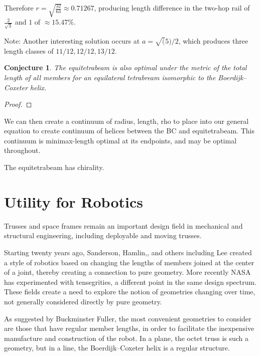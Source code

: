 \documentclass[11pt]{article}
\newtheorem{conjecture}{Conjecture}
\begin{document}
Therefore $ r = \sqrt{\frac{32}{63}} \approx 0.71267 $, producing length difference in the two-hop rail of
$\frac{2}{\sqrt{3}}$
and $1$ of $\approx 15.47\% $.

Note: Another interesting solution occurs at $a = \sqrt(5)/2$, which produces three length
classes of $11/12, 12/12, 13/12$.


\begin{conjecture}
  The equitetrabeam is also optimal under the metric of the total length of all members 
  for an equilateral tetrabream isomorphic to the Boerdijk--Coxeter helix.
\end{conjecture}

\begin{proof}
  
\end{proof}

We can then create a continuum of radius, length, rho to place into our general equation
to create continuum of helices between the BC and equitetrabeam. This continuum is 
minimax-length optimal at its endpoints, and may be optimal throughout.

The equitetrabeam has chirality.

\section{Utility for Robotics}

Trusses and space frames remain an important design field in mechanical and structural engineering\cite{mikulas1985sequentially},
including deployable and moving trusses\cite{claypool2012readily}.

Starting twenty years ago, Sanderson\cite{sanderson1996modular}, Hamlin,\cite{TetrobotBook}, and others including Lee\cite{lee2002dynamic}
created a style of robotics based on changing the lengths of members
joined at the center of a joint, thereby creating a connection to pure geometry. More recently NASA has experimented with
tensegrities\cite{NTRT}, a different point in the same design spectrum. These fields create a need to explore the notion of
geometries changing over time, not generally considered directly by pure geometry.

As suggested by Buckminster Fuller, the most convenient geometries to consider are those that have regular member
lengths, in order to facilitate the inexpensive manufacture and construction of the robot.  In a plane, the octet truss
is such a geometry, but in a line, the Boerdijk--Coxeter helix is a regular structure.
\end{document}
